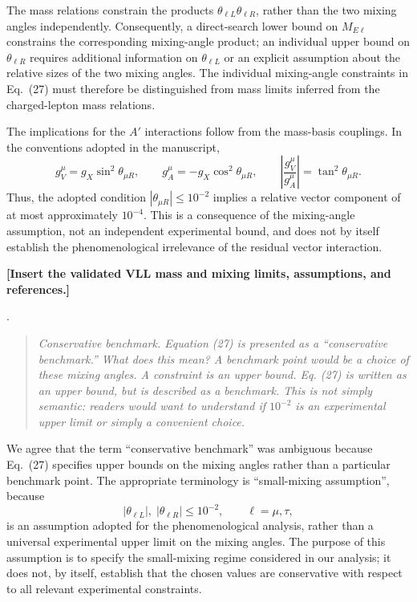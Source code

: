 \documentclass[12pt,a4paper]{article}
\begin{document}
The mass relations constrain the products \(\theta_{\ell L}\theta_{\ell R}\), rather than the two mixing angles independently. Consequently, a direct-search lower bound on \(M_{E\ell}\) constrains the corresponding mixing-angle product; an individual upper bound on \(\theta_{\ell R}\) requires additional information on \(\theta_{\ell L}\) or an explicit assumption about the relative sizes of the two mixing angles. The individual mixing-angle constraints in Eq.~(27) must therefore be distinguished from mass limits inferred from the charged-lepton mass relations.

The implications for the \(A'\) interactions follow from the mass-basis couplings. In the conventions adopted in the manuscript,
\[
g_V^\mu=g_X\sin^2\theta_{\mu R},
\qquad
g_A^\mu=-g_X\cos^2\theta_{\mu R},
\qquad
\left|\frac{g_V^\mu}{g_A^\mu}\right|
=\tan^2\theta_{\mu R}.
\]
Thus, the adopted condition \(|\theta_{\mu R}|\leq10^{-2}\) implies a relative vector component of at most approximately \(10^{-4}\). This is a consequence of the mixing-angle assumption, not an independent experimental bound, and does not by itself establish the phenomenological irrelevance of the residual vector interaction.

\textbf{[Insert the validated VLL mass and mixing limits, assumptions, and references.]}

\medskip
{}.
\begin{quote}\itshape
Conservative benchmark. Equation (27) is presented as a ``conservative benchmark.'' What does this mean? A benchmark point would be a choice of these mixing angles. A constraint is an upper bound. Eq. (27) is written as an upper bound, but is described as a benchmark. This is not simply semantic: readers would want to understand if \(10^{-2}\) is an experimental upper limit or simply a convenient choice.
\end{quote}

We agree that the term ``conservative benchmark'' was ambiguous because Eq.~(27) specifies upper bounds on the mixing angles rather than a particular benchmark point. The appropriate terminology is ``small-mixing assumption'', because
\[
|\theta_{\ell L}|,\;|\theta_{\ell R}|\leq10^{-2},
\qquad \ell=\mu,\tau,
\]
is an assumption adopted for the phenomenological analysis, rather than a universal experimental upper limit on the mixing angles. The purpose of this assumption is to specify the small-mixing regime considered in our analysis; it does not, by itself, establish that the chosen values are conservative with respect to all relevant experimental constraints.
\end{document}
